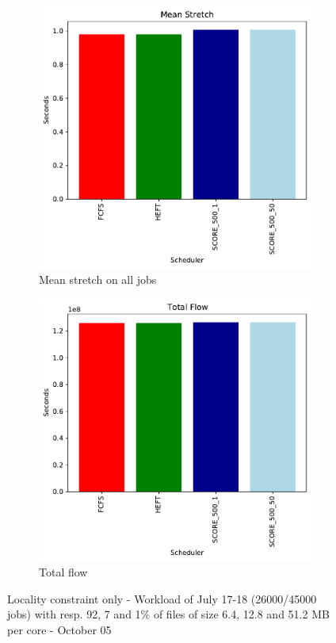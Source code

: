 \documentclass[a4paper]{article}
\begin{document}
\begin{figure}[H]
\begin{subfigure}[b]{0.4\linewidth}\centering\includegraphics[width=0.9\linewidth]{MBSS/plot/Results_FCFS_Score_Adaptative_Multiplier_2022-07-17->2022-07-18_V9271_Mean_Stretch_450_128_32_256_4_1024.pdf}\caption{Mean stretch on all jobs}\end{subfigure}
\begin{subfigure}[b]{0.4\linewidth}\centering\includegraphics[width=0.9\linewidth]{MBSS/plot/Results_FCFS_Score_Adaptative_Multiplier_2022-07-17->2022-07-18_V9271_Total_flow_450_128_32_256_4_1024.pdf}\caption{Total flow}\end{subfigure}
\caption{Locality constraint only - Workload of July 17-18 (26000/45000 jobs) with resp. 92, 7 and 1\% of files of size 6.4, 12.8 and 51.2 MB per core - October 05}\end{figure}
\end{document}
